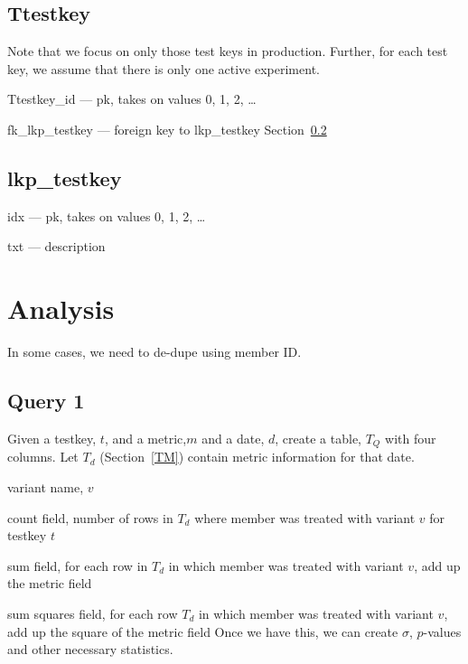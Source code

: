 \subsection{Ttestkey}
\label{Ttestkey}
Note that we focus on only those test keys in production. Further, for
each test key, we assume that there is only one active experiment. 

\be
\item Ttestkey\_id --- pk, takes on values 0, 1, 2, \ldots
\item fk\_lkp\_testkey --- foreign key to lkp\_testkey
Section~\ref{lkp_testkey}
\ee

\subsection{lkp\_testkey}
\label{lkp_testkey}
\be
\item idx --- pk, takes on values 0, 1, 2, \ldots
\item txt --- description
\ee

\section{Analysis}

In some cases, we need to de-dupe using member ID.

\subsection{Query 1}
\label{Query_1}

Given a testkey, \(t\),  and a metric,\(m\) and a date, \(d\), 
create a table, \(T_Q\) with four columns. 
Let \(T_d\) (Section~\ref{TM}) contain metric information for that date. 
\be
\item variant name, \(v\)
\item count field, number of rows in \(T_d\) where member was treated with variant
\(v\) for testkey \(t\)
\item sum field, for each row in \(T_d\) in which member was 
treated with variant \(v\), add up the metric field 
\item sum squares field, for each row \(T_d\) in which member 
was treated with variant \(v\), add up the square of the metric field 
\ee
Once we have this, we can create \(\sigma\), \(p\)-values and other necessary
statistics.


